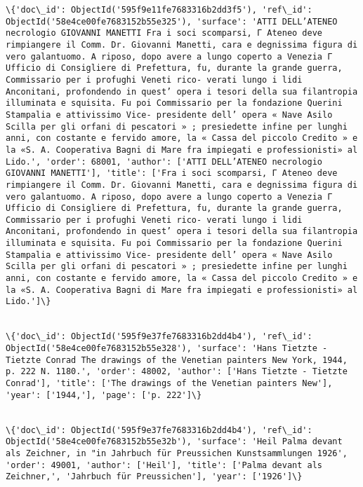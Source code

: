 \documentclass[11pt]{article}
\begin{document}
    \begin{Verbatim}[commandchars=\\\{\}]
\{'doc\_id': ObjectId('595f9e11fe7683316b2dd3f5'), 'ref\_id': ObjectId('58e4ce00fe7683152b55e325'), 'surface': 'ATTI DELL’ATENEO necrologio GIOVANNI MANETTI Fra i soci scomparsi, Γ Ateneo deve rimpiangere il Comm. Dr. Giovanni Manetti, cara e degnissima figura di vero galantuomo. A riposo, dopo avere a lungo coperto a Venezia Γ Ufficio di Consigliere di Prefettura, fu, durante la grande guerra, Commissario per i profughi Veneti rico- verati lungo i lidi Anconitani, profondendo in quest’ opera i tesori della sua filantropia illuminata e squisita. Fu poi Commissario per la fondazione Querini Stampalia e attivissimo Vice- presidente dell’ opera « Nave Asilo Scilla per gli orfani di pescatori » ; presiedette infine per lunghi anni, con costante e fervido amore, la « Cassa del piccolo Credito » e la «S. A. Cooperativa Bagni di Mare fra impiegati e professionisti» al Lido.', 'order': 68001, 'author': ['ATTI DELL’ATENEO necrologio GIOVANNI MANETTI'], 'title': ['Fra i soci scomparsi, Γ Ateneo deve rimpiangere il Comm. Dr. Giovanni Manetti, cara e degnissima figura di vero galantuomo. A riposo, dopo avere a lungo coperto a Venezia Γ Ufficio di Consigliere di Prefettura, fu, durante la grande guerra, Commissario per i profughi Veneti rico- verati lungo i lidi Anconitani, profondendo in quest’ opera i tesori della sua filantropia illuminata e squisita. Fu poi Commissario per la fondazione Querini Stampalia e attivissimo Vice- presidente dell’ opera « Nave Asilo Scilla per gli orfani di pescatori » ; presiedette infine per lunghi anni, con costante e fervido amore, la « Cassa del piccolo Credito » e la «S. A. Cooperativa Bagni di Mare fra impiegati e professionisti» al Lido.']\}


\{'doc\_id': ObjectId('595f9e37fe7683316b2dd4b4'), 'ref\_id': ObjectId('58e4ce00fe7683152b55e328'), 'surface': 'Hans Tietzte - Tietzte Conrad The drawings of the Venetian painters New York, 1944, p. 222 N. 1180.', 'order': 48002, 'author': ['Hans Tietzte - Tietzte Conrad'], 'title': ['The drawings of the Venetian painters New'], 'year': ['1944,'], 'page': ['p. 222']\}


\{'doc\_id': ObjectId('595f9e37fe7683316b2dd4b4'), 'ref\_id': ObjectId('58e4ce00fe7683152b55e32b'), 'surface': 'Heil Palma devant als Zeichner, in "in Jahrbuch für Preussichen Kunstsammlungen 1926', 'order': 49001, 'author': ['Heil'], 'title': ['Palma devant als Zeichner,', 'Jahrbuch für Preussichen'], 'year': ['1926']\}



    \end{Verbatim}
\end{document}
